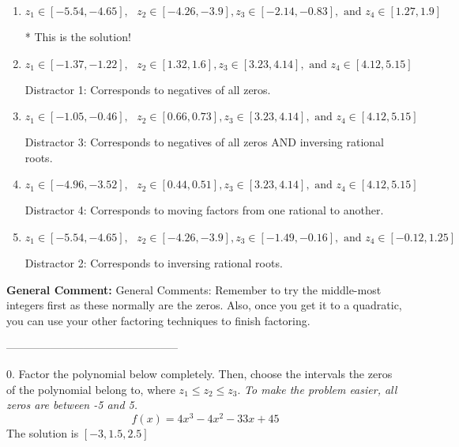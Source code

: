 \documentclass{extbook}[14pt]
\begin{document}
\begin{enumerate}[label=\Alph*.] 
\item $ z_1 \in [-5.54, -4.65], \text{   }  z_2 \in [-4.26, -3.9], z_3 \in [-2.14, -0.83], \text{   and   } z_4 \in [1.27, 1.9] $ 

 * This is the solution! 
\item $ z_1 \in [-1.37, -1.22], \text{   }  z_2 \in [1.32, 1.6], z_3 \in [3.23, 4.14], \text{   and   } z_4 \in [4.12, 5.15] $ 

  Distractor 1: Corresponds to negatives of all zeros. 
\item $ z_1 \in [-1.05, -0.46], \text{   }  z_2 \in [0.66, 0.73], z_3 \in [3.23, 4.14], \text{   and   } z_4 \in [4.12, 5.15] $ 

  Distractor 3: Corresponds to negatives of all zeros AND inversing rational roots. 
\item $ z_1 \in [-4.96, -3.52], \text{   }  z_2 \in [0.44, 0.51], z_3 \in [3.23, 4.14], \text{   and   } z_4 \in [4.12, 5.15] $ 

  Distractor 4: Corresponds to moving factors from one rational to another. 
\item $ z_1 \in [-5.54, -4.65], \text{   }  z_2 \in [-4.26, -3.9], z_3 \in [-1.49, -0.16], \text{   and   } z_4 \in [-0.12, 1.25] $ 

  Distractor 2: Corresponds to inversing rational roots. 
\end{enumerate} 
 
\textbf{General Comment:} General Comments: Remember to try the middle-most integers first as these normally are the zeros. Also, once you get it to a quadratic, you can use your other factoring techniques to finish factoring. 

-----------------------------------------------

0. Factor the polynomial below completely. Then, choose the intervals the zeros of the polynomial belong to, where $z_1 \leq z_2 \leq z_3$. \textit{To make the problem easier, all zeros are between -5 and 5.}
\[ f(x) = 4x^{3} -4 x^{2} -33 x + 45 \] 
The solution is $ [-3, 1.5, 2.5] $ 
\end{document}
